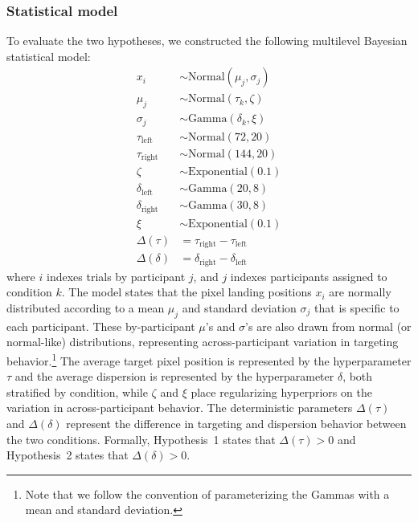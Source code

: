 \documentclass[doc,biblatex,floatsintext]{apa7}
\begin{document}
\subsubsection{Statistical model}

To evaluate the two hypotheses, we constructed the following multilevel Bayesian statistical model:
\begin{align*}
                  x_{i} & \sim \mathrm{Normal}(\mu_{j}, \sigma_{j}) \\
                \mu_{j} & \sim \mathrm{Normal}(\tau_k, \zeta) \\
             \sigma_{j} & \sim \mathrm{Gamma}(\delta_k, \xi) \\
     \tau_\mathrm{left} & \sim \mathrm{Normal}(72, 20) \\
    \tau_\mathrm{right} & \sim \mathrm{Normal}(144, 20) \\
                  \zeta & \sim \mathrm{Exponential}(0.1) \\
   \delta_\mathrm{left} & \sim \mathrm{Gamma}(20, 8) \\
  \delta_\mathrm{right} & \sim \mathrm{Gamma}(30, 8) \\
                    \xi & \sim \mathrm{Exponential}(0.1) \\
           \Delta(\tau) & = \tau_\mathrm{right} - \tau_\mathrm{left} \\
         \Delta(\delta) & = \delta_\mathrm{right} - \delta_\mathrm{left}
\end{align*}
where $i$ indexes trials by participant $j$, and $j$ indexes participants assigned to condition $k$. The model states that the pixel landing positions $x_i$ are normally distributed according to a mean $\mu_{j}$ and standard deviation $\sigma_{j}$ that is specific to each participant. These by-participant $\mu$'s and $\sigma$'s are also drawn from normal (or normal-like) distributions, representing across-participant variation in targeting behavior.\footnote{Note that we follow the convention of parameterizing the Gammas with a mean and standard deviation.} The average target pixel position is represented by the hyperparameter $\tau$ and the average dispersion is represented by the hyperparameter $\delta$, both stratified by condition, while $\zeta$ and $\xi$ place regularizing hyperpriors on the variation in across-participant behavior. The deterministic parameters $\Delta(\tau)$ and $\Delta(\delta)$ represent the difference in targeting and dispersion behavior between the two conditions. Formally, Hypothesis~1 states that $\Delta(\tau) > 0$ and Hypothesis~2 states that $\Delta(\delta) > 0$.
\end{document}
